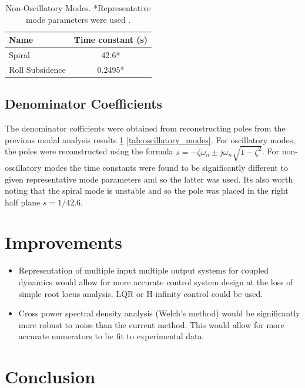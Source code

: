 \documentclass{article}
\begin{document}
\begin{table}[H]
  \centering
  \begin{tabular}{lc}
      \toprule
      Name & Time constant (s) \\
      \midrule
      Spiral & 42.6* \\
      Roll Subsidence & 0.2495* \\
      \bottomrule
  \end{tabular}
  \caption{Non-Oscillatory Modes. *Representative mode parameters were used \cite{rep}.}
  \label{tab:non_oscillatory_modes}
\end{table}

\subsection{Denominator Coefficients}

The denominator cofficients were obtained from reconstructing poles from the previous modal analysis results \ref{tab:non_oscillatory_modes} \ref{tab:oscillatory_modes}.
For oscillatory modes, the poles were reconstructed using the formula $s = -\zeta\omega_n \pm j\omega_n\sqrt{1-\zeta^2}$.
For non-oscillatory modes the time constants were found to be significantly different to given representative mode parameters \cite{rep} and so the latter was used.
Its also worth noting that the spiral mode is unstable and so the pole was placed in the right half plane $s = 1/42.6$.

\section{Improvements}

\begin{itemize}
    \item Representation of multiple input multiple output systems for coupled dynamics would allow for more accurate control system design at the loss of simple root locus analysis. LQR or H-infinity control could be used.
    \item Cross power spectral density analysis (Welch's method) would be significantly more robust to noise than the current method.
    This would allow for more accurate numerators to be fit to experimental data.
\end{itemize}


\section{Conclusion}
\end{document}
